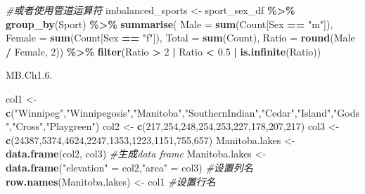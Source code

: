 \documentclass[
]{article}
\newenvironment{Shaded}{\begin{snugshade}}{\end{snugshade}}
\newcommand{\AttributeTok}[1]{\textcolor[rgb]{0.13,0.29,0.53}{#1}}
\newcommand{\CommentTok}[1]{\textcolor[rgb]{0.56,0.35,0.01}{\textit{#1}}}
\newcommand{\DecValTok}[1]{\textcolor[rgb]{0.00,0.00,0.81}{#1}}
\newcommand{\FloatTok}[1]{\textcolor[rgb]{0.00,0.00,0.81}{#1}}
\newcommand{\FunctionTok}[1]{\textcolor[rgb]{0.13,0.29,0.53}{\textbf{#1}}}
\newcommand{\NormalTok}[1]{#1}
\newcommand{\OtherTok}[1]{\textcolor[rgb]{0.56,0.35,0.01}{#1}}
\newcommand{\SpecialCharTok}[1]{\textcolor[rgb]{0.81,0.36,0.00}{\textbf{#1}}}
\newcommand{\StringTok}[1]{\textcolor[rgb]{0.31,0.60,0.02}{#1}}
\begin{document}
\begin{Shaded}
\begin{Highlighting}[]
\CommentTok{\#或者使用管道运算符}
\NormalTok{imbalanced\_sports }\OtherTok{\textless{}{-}}\NormalTok{ sport\_sex\_df }\SpecialCharTok{\%\textgreater{}\%} \FunctionTok{group\_by}\NormalTok{(Sport) }\SpecialCharTok{\%\textgreater{}\%} \FunctionTok{summarise}\NormalTok{( }
  \AttributeTok{Male =} \FunctionTok{sum}\NormalTok{(Count[Sex }\SpecialCharTok{==} \StringTok{"m"}\NormalTok{]),}
  \AttributeTok{Female =} \FunctionTok{sum}\NormalTok{(Count[Sex }\SpecialCharTok{==} \StringTok{"f"}\NormalTok{]),}
  \AttributeTok{Total =} \FunctionTok{sum}\NormalTok{(Count),}
  \AttributeTok{Ratio =} \FunctionTok{round}\NormalTok{(Male }\SpecialCharTok{/}\NormalTok{ Female, }\DecValTok{2}\NormalTok{)) }\SpecialCharTok{\%\textgreater{}\%} \FunctionTok{filter}\NormalTok{(Ratio }\SpecialCharTok{\textgreater{}} \DecValTok{2} \SpecialCharTok{|}\NormalTok{ Ratio }\SpecialCharTok{\textless{}} \FloatTok{0.5} \SpecialCharTok{|} \FunctionTok{is.infinite}\NormalTok{(Ratio))}
\end{Highlighting}
\end{Shaded}

MB.Ch1.6.

\begin{Shaded}
\begin{Highlighting}[]
\NormalTok{ col1 }\OtherTok{\textless{}{-}} \FunctionTok{c}\NormalTok{(}\StringTok{"Winnipeg"}\NormalTok{,}\StringTok{"Winnipegosis"}\NormalTok{,}\StringTok{"Manitoba"}\NormalTok{,}\StringTok{"SouthernIndian"}\NormalTok{,}\StringTok{"Cedar"}\NormalTok{,}\StringTok{"Island"}\NormalTok{,}\StringTok{"Gods"}\NormalTok{,}\StringTok{"Cross"}\NormalTok{,}\StringTok{"Playgreen"}\NormalTok{)}
\NormalTok{ col2 }\OtherTok{\textless{}{-}} \FunctionTok{c}\NormalTok{(}\DecValTok{217}\NormalTok{,}\DecValTok{254}\NormalTok{,}\DecValTok{248}\NormalTok{,}\DecValTok{254}\NormalTok{,}\DecValTok{253}\NormalTok{,}\DecValTok{227}\NormalTok{,}\DecValTok{178}\NormalTok{,}\DecValTok{207}\NormalTok{,}\DecValTok{217}\NormalTok{)}
\NormalTok{ col3 }\OtherTok{\textless{}{-}} \FunctionTok{c}\NormalTok{(}\DecValTok{24387}\NormalTok{,}\DecValTok{5374}\NormalTok{,}\DecValTok{4624}\NormalTok{,}\DecValTok{2247}\NormalTok{,}\DecValTok{1353}\NormalTok{,}\DecValTok{1223}\NormalTok{,}\DecValTok{1151}\NormalTok{,}\DecValTok{755}\NormalTok{,}\DecValTok{657}\NormalTok{)}
\NormalTok{ Manitoba.lakes }\OtherTok{\textless{}{-}} \FunctionTok{data.frame}\NormalTok{(col2, col3) }\CommentTok{\#生成data frame}
\NormalTok{ Manitoba.lakes }\OtherTok{\textless{}{-}} \FunctionTok{data.frame}\NormalTok{(}\StringTok{"elevation"} \OtherTok{=}\NormalTok{ col2,}\StringTok{"area"} \OtherTok{=}\NormalTok{ col3) }\CommentTok{\#设置列名}
 \FunctionTok{row.names}\NormalTok{(Manitoba.lakes) }\OtherTok{\textless{}{-}}\NormalTok{ col1 }\CommentTok{\#设置行名}
\end{Highlighting}
\end{Shaded}
\end{document}
